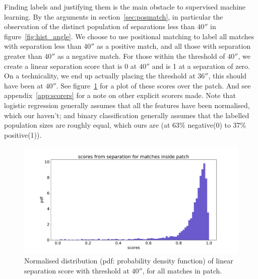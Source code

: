\documentclass[12pt,a4paper]{article}
\begin{document}
Finding labels and justifying them is the main obstacle to supervised machine learning. By the arguments in section~\ref{sec:posmatch}, in particular the observation of the distinct population of separations less than $\ang{;;40}$ in figure~\ref{fig:hist_angle}. We choose to use positional matching to label all matches with separation less than $\ang{;;40}$ as a positive match, and all those with separation greater than $\ang{;;40}$ as a negative match. For those within the threshold of $\ang{;;40}$, we create a linear separation score that is 0 at $\ang{;;40}$ and is 1 at a separation of zero. On a technicality, we end up actually placing the threshold at $\ang{;;36}$, this should have been at $\ang{;;40}$.
See figure~\ref{fig:patch_scores_dist} for a plot of these scores over the patch. And see appendix~\ref{app:scorers} for a note on other explicit scorers made. Note that logistic regression generally assumes that all the features have been normalised, which our haven't; and binary classification generally assumes that the labelled population sizes are roughly equal, which ours are (at 63\% negative(0) to 37\% positive(1)).
\begin{figure}[H]
    \centering
    \includegraphics[width=\textwidth]{pics/patch_scores_dist.pdf}
    \caption{Normalised distribution (pdf: probability density function) of linear separation score with threshold at $\ang{;;40}$, for all matches in patch.}
    \label{fig:patch_scores_dist}
\end{figure}

\newpage
\end{document}
